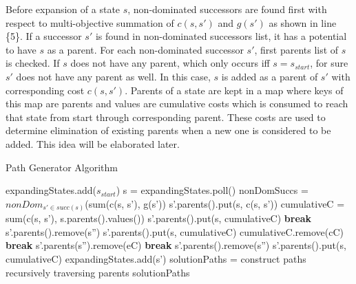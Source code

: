 \documentclass[10pt,journal]{IEEEtran}
\begin{document}
Before expansion of a state $s$, non-dominated successors are found first with respect to multi-objective summation of $c(s,s')$ and $g(s')$ as shown in line \{5\}. If a successor $s'$ is found in non-dominated successors list, it has a potential to have $s$ as a parent. For each non-dominated successor $s'$, first parents list of $s$ is checked. If $s$ does not have any parent, which only occurs iff $s=s_{start}$, for sure $s'$ does not have any parent as well. In this case, $s$ is added  as a parent of $s'$ with corresponding cost $c(s,s')$. Parents of a state are kept in a map where keys of this map are parents and values are cumulative costs which is consumed to reach that state from start through corresponding parent. These costs are used to determine elimination of existing parents when a new one is considered to be added. This idea will be elaborated later.

\begin{algorithm}
	\caption{Path Generator Algorithm}
	\label{algPathGen}
    \begin{algorithmic}[1]
			\State expandingStates.add($s_{start}$)
    				\State s = expandingStates.poll()
				\State nonDomSuccs = $nonDom_{s' \in succ(s)}$(sum(c(s, s'), g(s'))
    						\State s'.parents().put(s, c(s, s'))
    					\Else
    						\State cumulativeC = sum(c(s, s'), s.parents().values())
    							\State s'.parents().put(s, cumulativeC)
    						\Else
									\State \textbf{break}
									\State s'.parents().remove(s'')
									\State s'.parents().put(s, cumulativeC)
								\Else
												\State cumulativeC.remove(cC) 
												\State \textbf{break}
												\State s'.parents(s'').remove(eC) 
												\State \textbf{break}
											\EndIf
										\EndFor
											\State s'.parents().remove(s'')
										\EndIf
									\EndFor
											\State s'.parents().put(s, cumulativeC)
									\EndIf
								\EndIf
							\EndFor    						
    						\EndIf
    					\EndIf
    						\State expandingStates.add(s')
    					\EndIf
    				\EndFor
    			\EndWhile
    			\State solutionPaths = construct paths recursively traversing parents
    			\State \Return solutionPaths
    		\EndFunction
	\end{algorithmic}
\end{algorithm}
\end{document}

